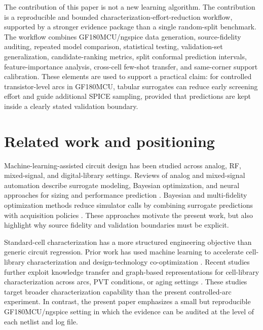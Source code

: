 \documentclass[preprint,12pt]{elsarticle}
\begin{document}
The contribution of this paper is not a new learning algorithm. The contribution is a reproducible and bounded characterization-effort-reduction workflow, supported by a stronger evidence package than a single random-split benchmark. The workflow combines GF180MCU/ngspice data generation, source-fidelity auditing, repeated model comparison, statistical testing, validation-set generalization, candidate-ranking metrics, split conformal prediction intervals, feature-importance analysis, cross-cell few-shot transfer, and same-corner support calibration. These elements are used to support a practical claim: for controlled transistor-level arcs in GF180MCU, tabular surrogates can reduce early screening effort and guide additional SPICE sampling, provided that predictions are kept inside a clearly stated validation boundary.

\section{Related work and positioning}

Machine-learning-assisted circuit design has been studied across analog, RF, mixed-signal, and digital-library settings. Reviews of analog and mixed-signal automation describe surrogate modeling, Bayesian optimization, and neural approaches for sizing and performance prediction \cite{Fayazi_AI_AMS_Review_2021,Afacan_ML_AnalogRF_Review_2021,Mina_ML_AnalogIC_Review_2022}. Bayesian and multi-fidelity optimization methods reduce simulator calls by combining surrogate predictions with acquisition policies \cite{Lyu_Bayesian_Analog_2018,Zhang_MultiFidelity_BO_DAC_2019,He_Batched_MultiFidelity_BO_TCAD_2023}. These approaches motivate the present work, but also highlight why source fidelity and validation boundaries must be explicit.

Standard-cell characterization has a more structured engineering objective than generic circuit regression. Prior work has used machine learning to accelerate cell-library characterization and design-technology co-optimization \cite{Klemme_CellLib_ML_DTCO_ICCAD_2020,Klemme_Reliability_CellLib_TCASI_2021}. Recent studies further exploit knowledge transfer and graph-based representations for cell-library characterization across arcs, PVT conditions, or aging settings \cite{Tang_KnowledgeTransfer_CellLib_MEJO_2025,Ma_GNN_CellLib_Integration_2025}. These studies target broader characterization capability than the present controlled-arc experiment. In contrast, the present paper emphasizes a small but reproducible GF180MCU/ngspice setting in which the evidence can be audited at the level of each netlist and log file.
\end{document}
